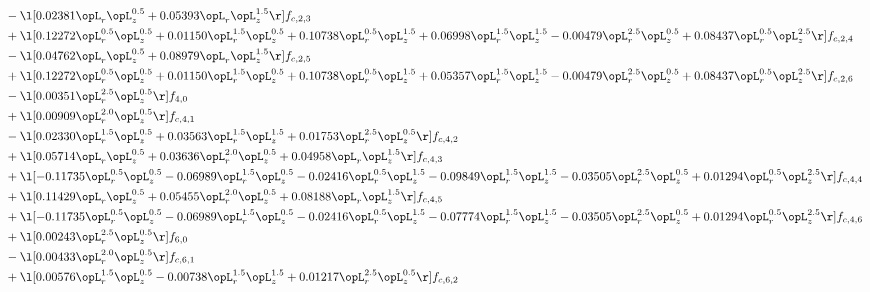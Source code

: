 \begin{alignat}{2}
& - \l[  0.02381 \opL_r \opL_z^{0.5} +  0.05393 \opL_r \opL_z^{1.5}  \r] f_{c,2,3} \nonumber \\ 
& + \l[  0.12272 \opL_r^{0.5} \opL_z^{0.5} +  0.01150 \opL_r^{1.5} \opL_z^{0.5} +  0.10738 \opL_r^{0.5} \opL_z^{1.5} +  0.06998 \opL_r^{1.5} \opL_z^{1.5}   -0.00479 \opL_r^{2.5} \opL_z^{0.5} +  0.08437 \opL_r^{0.5} \opL_z^{2.5}  \r] f_{c,2,4} \nonumber \\ 
& - \l[  0.04762 \opL_r \opL_z^{0.5} +  0.08979 \opL_r \opL_z^{1.5}  \r] f_{c,2,5} \nonumber \\ 
& + \l[  0.12272 \opL_r^{0.5} \opL_z^{0.5} +  0.01150 \opL_r^{1.5} \opL_z^{0.5} +  0.10738 \opL_r^{0.5} \opL_z^{1.5} +  0.05357 \opL_r^{1.5} \opL_z^{1.5}   -0.00479 \opL_r^{2.5} \opL_z^{0.5} +  0.08437 \opL_r^{0.5} \opL_z^{2.5}  \r] f_{c,2,6} \nonumber \\ 
& - \l[  0.00351 \opL_r^{2.5} \opL_z^{0.5}  \r] f_{4,0} \nonumber \\ 
& + \l[  0.00909 \opL_r^{2.0} \opL_z^{0.5}  \r] f_{c,4,1} \nonumber \\ 
& - \l[  0.02330 \opL_r^{1.5} \opL_z^{0.5} +  0.03563 \opL_r^{1.5} \opL_z^{1.5} +  0.01753 \opL_r^{2.5} \opL_z^{0.5}  \r] f_{c,4,2} \nonumber \\ 
& + \l[  0.05714 \opL_r \opL_z^{0.5} +  0.03636 \opL_r^{2.0} \opL_z^{0.5} +  0.04958 \opL_r \opL_z^{1.5}  \r] f_{c,4,3} \nonumber \\ 
& + \l[  -0.11735 \opL_r^{0.5} \opL_z^{0.5}   -0.06989 \opL_r^{1.5} \opL_z^{0.5}   -0.02416 \opL_r^{0.5} \opL_z^{1.5}   -0.09849 \opL_r^{1.5} \opL_z^{1.5}   -0.03505 \opL_r^{2.5} \opL_z^{0.5} +  0.01294 \opL_r^{0.5} \opL_z^{2.5}  \r] f_{c,4,4} \nonumber \\ 
& + \l[  0.11429 \opL_r \opL_z^{0.5} +  0.05455 \opL_r^{2.0} \opL_z^{0.5} +  0.08188 \opL_r \opL_z^{1.5}  \r] f_{c,4,5} \nonumber \\ 
& + \l[  -0.11735 \opL_r^{0.5} \opL_z^{0.5}   -0.06989 \opL_r^{1.5} \opL_z^{0.5}   -0.02416 \opL_r^{0.5} \opL_z^{1.5}   -0.07774 \opL_r^{1.5} \opL_z^{1.5}   -0.03505 \opL_r^{2.5} \opL_z^{0.5} +  0.01294 \opL_r^{0.5} \opL_z^{2.5}  \r] f_{c,4,6} \nonumber \\ 
& + \l[  0.00243 \opL_r^{2.5} \opL_z^{0.5}  \r] f_{6,0} \nonumber \\ 
& - \l[  0.00433 \opL_r^{2.0} \opL_z^{0.5}  \r] f_{c,6,1} \nonumber \\ 
& + \l[  0.00576 \opL_r^{1.5} \opL_z^{0.5}   -0.00738 \opL_r^{1.5} \opL_z^{1.5} +  0.01217 \opL_r^{2.5} \opL_z^{0.5}  \r] f_{c,6,2} \nonumber \\ 

\end{alignat}
